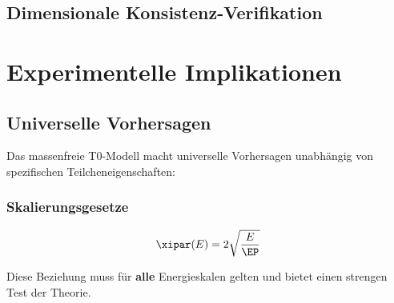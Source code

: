 	\subsection{Dimensionale Konsistenz-Verifikation}
	\label{subsec:dimensional_consistency}
	
	\begin{table}[htbp]
		\centering
		\caption{Dimensionale Konsistenz der massenfreien Formulierungen}
	\end{table}
	
	\section{Experimentelle Implikationen}
	\label{sec:experimental_implications}
	
	\subsection{Universelle Vorhersagen}
	\label{subsec:universal_predictions}
	
	Das massenfreie T0-Modell macht universelle Vorhersagen unabhängig von spezifischen Teilcheneigenschaften:
	
	\subsubsection{Skalierungsgesetze}
	
	\begin{equation}
		\xipar(E) = 2\sqrt{\frac{E}{\EP}}
		\label{eq:universal_scaling}
	\end{equation}
	
	Diese Beziehung muss für \textbf{alle} Energieskalen gelten und bietet einen strengen Test der Theorie.
	
